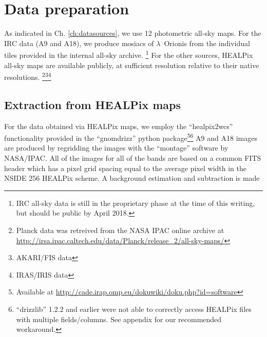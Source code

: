 	\section{Data preparation}
		As indicated in Ch. \hyperref[ch:datasources]{\ref{ch:datasources}}, we use 12 photometric all-sky maps. For the IRC data (A9 and A18), we produce mosiacs of $\lambda$~Orionis from the individual tiles provided in the internal all-sky archive.
      \footnote{IRC all-sky data is still in the proprietary phase at the time of this writing, but should be public by April 2018.}
       For the other sources, HEALPix all-sky maps are available publicly, at sufficient resolution relative to their native resolutions. \footnote{Planck data was retreived from the NASA IPAC online archive at \url{http://irsa.ipac.caltech.edu/data/Planck/release_2/all-sky-maps/}}\footnote{AKARI/FIS data }\footnote{IRAS/IRIS data }

		\subsection{Extraction from HEALPix maps}
		  For the data obtained via HEALPix maps, we employ the ``healpix2wcs'' functionality provided in the ``gnomdrizz'' python package\footnote{Available at \url{http://cade.irap.omp.eu/dokuwiki/doku.php?id=software}}\footnote{``drizzlib'' 1.2.2 and earlier were not able to correctly access HEALPix files with multiple fields/columns. See appendix for our recommended workaround.} A9 and A18 images are produced by regridding the images with the ``montage'' software by NASA/IPAC. All of the images for all of the bands are based on a common FITS header which has a pixel grid spacing equal to the average pixel width in the NSIDE 256 HEALPix scheme.
      A background estimation and subtraction is made

